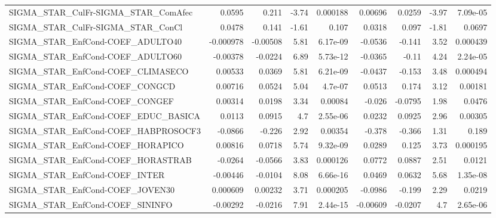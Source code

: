 \begin{tabular}{lrrrrrrrr}
SIGMA\_STAR\_CulFr-SIGMA\_STAR\_ComAfec    &      0.0595 &        0.211 &    -3.74 & 0.000188 &    0.00696 &      0.0259 &        -3.97 &      7.09e-05 \\
SIGMA\_STAR\_CulFr-SIGMA\_STAR\_ConCl      &      0.0478 &        0.141 &    -1.61 &    0.107 &     0.0318 &       0.097 &        -1.81 &        0.0697 \\
SIGMA\_STAR\_EnfCond-COEF\_ADULTO40       &   -0.000978 &     -0.00508 &     5.81 & 6.17e-09 &    -0.0536 &      -0.141 &         3.52 &      0.000439 \\
SIGMA\_STAR\_EnfCond-COEF\_ADULTO60       &    -0.00378 &      -0.0224 &     6.89 & 5.73e-12 &    -0.0365 &       -0.11 &         4.24 &      2.24e-05 \\
SIGMA\_STAR\_EnfCond-COEF\_CLIMASECO      &     0.00533 &       0.0369 &     5.81 & 6.21e-09 &    -0.0437 &      -0.153 &         3.48 &      0.000494 \\
SIGMA\_STAR\_EnfCond-COEF\_CONGCD         &     0.00716 &       0.0524 &     5.04 &  4.7e-07 &     0.0513 &       0.174 &         3.12 &       0.00181 \\
SIGMA\_STAR\_EnfCond-COEF\_CONGEF         &     0.00314 &       0.0198 &     3.34 &  0.00084 &     -0.026 &     -0.0795 &         1.98 &        0.0476 \\
SIGMA\_STAR\_EnfCond-COEF\_EDUC\_BASICA    &      0.0113 &       0.0915 &      4.7 & 2.55e-06 &     0.0232 &      0.0925 &         2.96 &       0.00305 \\
SIGMA\_STAR\_EnfCond-COEF\_HABPROSOCF3    &     -0.0866 &       -0.226 &     2.92 &  0.00354 &     -0.378 &      -0.366 &         1.31 &         0.189 \\
SIGMA\_STAR\_EnfCond-COEF\_HORAPICO       &     0.00816 &       0.0718 &     5.74 & 9.32e-09 &     0.0289 &       0.125 &         3.73 &      0.000195 \\
SIGMA\_STAR\_EnfCond-COEF\_HORASTRAB      &     -0.0264 &      -0.0566 &     3.83 & 0.000126 &     0.0772 &      0.0887 &         2.51 &        0.0121 \\
SIGMA\_STAR\_EnfCond-COEF\_INTER          &    -0.00446 &      -0.0104 &     8.08 & 6.66e-16 &     0.0469 &      0.0632 &         5.68 &      1.35e-08 \\
SIGMA\_STAR\_EnfCond-COEF\_JOVEN30        &    0.000609 &      0.00232 &     3.71 & 0.000205 &    -0.0986 &      -0.199 &         2.29 &        0.0219 \\
SIGMA\_STAR\_EnfCond-COEF\_SININFO        &    -0.00292 &      -0.0216 &     7.91 & 2.44e-15 &   -0.00609 &     -0.0207 &          4.7 &      2.65e-06 \\

\end{tabular}
